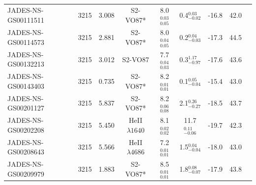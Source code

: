 \begin{tabular}{@{}lcccccccc@{}}
JADES-NS-GS00111511& 3215 &  3.008&S2-VO87*&  8.0$^{0.03}_{0.05}$&  0.4$^{0.03}_{-0.02}$& -16.8&  42.0&\\
JADES-NS-GS00114573& 3215 &  2.881&S2-VO87*&  8.0$^{0.04}_{0.05}$&  0.2$^{0.04}_{-0.03}$& -17.3&  44.5&\\
JADES-NS-GS00132213& 3215 &  3.012&S2-VO87&  7.7$^{0.04}_{0.03}$&  0.3$^{1.17}_{-0.97}$& -17.6&  43.6&\\
JADES-NS-GS00143403& 3215 &  0.735&S2-VO87*&  8.2$^{0.01}_{0.01}$&  0.1$^{0.05}_{-0.04}$& -15.4&  43.0&\\
JADES-NS-GS00201127& 3215 &  5.837&S2-VO87*&  8.2$^{0.06}_{0.08}$&  2.1$^{0.26}_{-0.27}$& -18.5&  43.7&\\
JADES-NS-GS00202208& 3215 &  5.450&HeII$\lambda1640$&  8.1$^{0.02}_{0.02}$&  11.7$^{0.11}_{-0.06}$& -19.7&  42.3&\\
JADES-NS-GS00208643& 3215 &  5.566&HeII$\lambda4686$&  7.2$^{0.01}_{0.01}$&  1.5$^{0.04}_{-0.04}$& -18.0&  43.0&\\
JADES-NS-GS00209979& 3215 &  1.883&S2-VO87*&  8.5$^{0.01}_{0.01}$&  1.8$^{0.08}_{-0.07}$& -17.9&  43.8&\\
\hline
\end{tabular}
